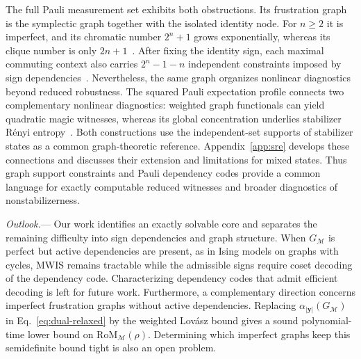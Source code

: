 \documentclass[10pt,aps,pra,twocolumn,floatfix,nofootinbib,superscriptaddress,longbibliography]{revtex4-2}
\newcommand{\Mcal}{\mathcal M}
\newcommand{\RoM}{\mathrm{RoM}}
\providecommand{\mathbm}[1]{\bm{#1}}
\begin{document}
	The full Pauli measurement set exhibits both obstructions. Its frustration graph is the symplectic graph together with the isolated identity node. For $n\ge2$ it is imperfect, and its chromatic number $2^n+1$ grows exponentially, whereas its clique number is only $2n+1$~\cite{brouwer2012spectra}. After fixing the identity sign, each maximal commuting context also carries $2^n-1-n$ independent constraints imposed by sign dependencies~\cite{varela2026predictingmagicmeasurements}. Nevertheless, the same graph organizes nonlinear diagnostics beyond reduced robustness. The squared Pauli expectation profile connects two complementary nonlinear diagnostics: weighted graph functionals can yield quadratic magic witnesses, whereas its global concentration underlies stabilizer R\'enyi entropy~\cite{xu2025simultaneous,leone2022stabilizer}. Both constructions use the independent-set supports of stabilizer states as a common graph-theoretic reference.
	Appendix~\ref{app:sre} develops these connections and discusses their extension and limitations for mixed states. Thus graph support constraints and Pauli dependency codes provide a common language for exactly computable reduced witnesses and broader diagnostics of nonstabilizerness.
	
	\emph{Outlook.}---
	\label{sec:outlook}
	Our work identifies an exactly solvable core and separates the remaining difficulty into sign dependencies and graph structure. When $G_\Mcal$ is perfect but active dependencies are present, as in Ising models on graphs with cycles, MWIS remains tractable while the admissible signs require coset decoding of the dependency code. Characterizing dependency codes that admit efficient decoding is left for future work. Furthermore, a complementary direction concerns imperfect frustration graphs without active dependencies. Replacing $\alpha_{|\mathbm{y}|}(G_\Mcal)$ in Eq.~\eqref{eq:dual-relaxed} by the weighted Lov\'asz bound gives a sound polynomial-time lower bound on $\RoM_\Mcal(\rho)$. Determining which imperfect graphs keep this semidefinite bound tight is also an open problem.
	
\end{document}
